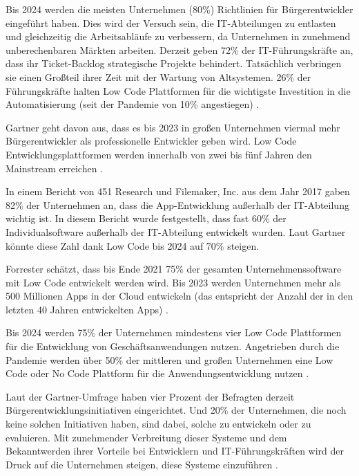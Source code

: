 \documentclass[12pt]{article} %
\begin{document}
	Bis 2024 werden die meisten Unternehmen (80\%) Richtlinien für Bürgerentwickler eingeführt haben. Dies wird der Versuch sein, die IT-Abteilungen zu entlasten und gleichzeitig die Arbeitsabläufe zu verbessern, da Unternehmen in zunehmend unberechenbaren Märkten arbeiten. 	
	Derzeit geben 72\% der IT-Führungskräfte an, dass ihr Ticket-Backlog strategische Projekte behindert. Tatsächlich verbringen sie einen Großteil ihrer Zeit mit der Wartung von Altsystemen. 26\% der Führungskräfte halten Low Code Plattformen für die wichtigste Investition in die Automatisierung (seit der Pandemie von 10\% angestiegen) \autocite{KevinShuler.2023}. \newline
	
	Gartner geht davon aus, dass es bis 2023 in großen Unternehmen viermal mehr Bürgerentwickler als professionelle Entwickler geben wird. Low Code Entwicklungsplattformen werden innerhalb von zwei bis fünf Jahren den Mainstream erreichen \autocite{KevinShuler.2023}. \newline
	
	In einem Bericht von 451 Research und Filemaker, Inc. aus dem Jahr 2017 gaben 82\% der Unternehmen an, dass die App-Entwicklung außerhalb der IT-Abteilung wichtig ist. In diesem Bericht wurde festgestellt, dass fast 60\% der Individualsoftware außerhalb der IT-Abteilung entwickelt wurden. Laut Gartner könnte diese Zahl dank Low Code bis 2024 auf 70\% steigen. \newline
	
	Forrester schätzt, dass bis Ende 2021 75\% der gesamten Unternehmenssoftware mit Low Code entwickelt werden wird. Bis 2023 werden Unternehmen mehr als 500 Millionen Apps in der Cloud entwickeln (das entspricht der Anzahl der in den letzten 40 Jahren entwickelten Apps) \autocite{KevinShuler.2023}. \newline
	
	Bis 2024 werden 75\% der Unternehmen mindestens vier Low Code Plattformen für die Entwicklung von Geschäftsanwendungen nutzen. Angetrieben durch die Pandemie werden über 50\% der mittleren und großen Unternehmen eine Low Code oder No Code Plattform für die Anwendungsentwicklung nutzen \autocite{KevinShuler.2023}. \newline
	
	Laut der Gartner-Umfrage haben vier Prozent der Befragten derzeit Bürgerentwicklungsinitiativen eingerichtet. Und 20\% der Unternehmen, die noch keine solchen Initiativen haben, sind dabei, solche zu entwickeln oder zu evaluieren. Mit zunehmender Verbreitung dieser Systeme und dem Bekanntwerden ihrer Vorteile bei Entwicklern und IT-Führungskräften wird der Druck auf die Unternehmen steigen, diese Systeme einzuführen \autocite{KevinShuler.2023}. \newline
	
\end{document}
